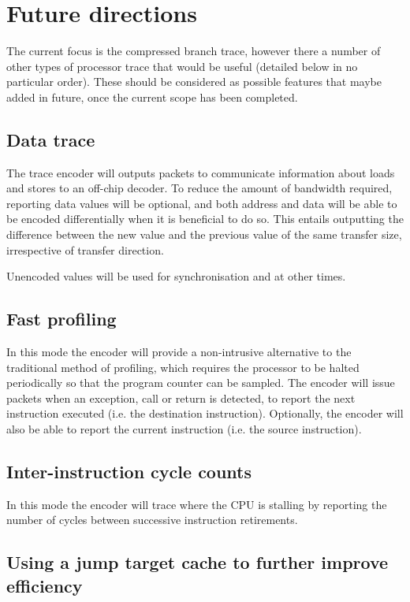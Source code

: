 \chapter{Future directions} \label{Future}

The current focus is the compressed branch trace, however there a
number of other types of processor trace that would be useful 
(detailed below in no particular order). These
should be considered as possible features that maybe added in future,
once the current scope has been completed.

\section{Data trace}

The trace encoder will outputs packets to communicate information
about loads and stores to an off-chip decoder.  To reduce the amount
of bandwidth required, reporting data values will be optional, and
both address and data will be able to be encoded differentially when
it is beneficial to do so.  This entails outputting the difference
between the new value and the previous value of the same transfer
size, irrespective of transfer direction.

Unencoded values will be used for synchronisation and at other times.

\section{Fast profiling}

In this mode the encoder will provide a non-intrusive alternative to
the traditional method of profiling, which requires the processor to
be halted periodically so that the program counter can be sampled.
The encoder will issue packets when an exception, call or return is
detected, to report the next instruction executed (i.e. the
destination instruction).  Optionally, the encoder will also be able to
report the current instruction (i.e. the source instruction).

\section{Inter-instruction cycle counts}

In this mode the encoder will trace where the CPU is stalling by
reporting the number of cycles between successive instruction
retirements.

\section{Using a jump target cache to further improve efficiency}

